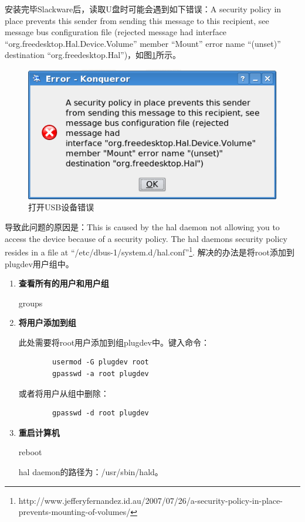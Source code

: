 \documentclass[paper=a4,fontsize=11pt]{article}
\begin{document}
	安装完毕Slackware后，读取U盘时可能会遇到如下错误：A security policy in place prevents this sender from sending this message to this recipient, see message bus configuration file (rejected message had interface “org.freedesktop.Hal.Device.Volume” member “Mount” error name “(unset)” destination “org.freedesktop.Hal”)，如图\ref*{USBSecurityError}所示。
	\begin{figure}[htbp]
		\centering
		\includegraphics[scale=0.7]{USBSecurityError.png}
		\caption{打开USB设备错误}
		\label{USBSecurityError}
	\end{figure}
	导致此问题的原因是：This is caused by the hal daemon not allowing you to access the device because of a security policy. The hal daemons security policy resides in a file at “/etc/dbus-1/system.d/hal.conf”\footnote{http://www.jefferyfernandez.id.au/2007/07/26/a-security-policy-in-place-prevents-mounting-of-volumes/}. 解决的办法是将root添加到plugdev用户组中。
	\begin{enumerate}
		\setcounter{enumi}{0}
		\item{\textbf{查看所有的用户和用户组}}
		
		groups
		
		\item{\textbf{将用户添加到组}}
		
		此处需要将root用户添加到组plugdev中。键入命令：
		\begin{lstlisting}
		usermod -G plugdev root
		gpasswd -a root plugdev
		\end{lstlisting}
		或者将用户从组中删除：
		\begin{lstlisting}
		gpasswd -d root plugdev
		\end{lstlisting}
		
		\item{\textbf{重启计算机}}
		
		reboot
		
		hal daemon的路径为：/usr/sbin/hald。
		
	\end{enumerate}
	
\end{document}
